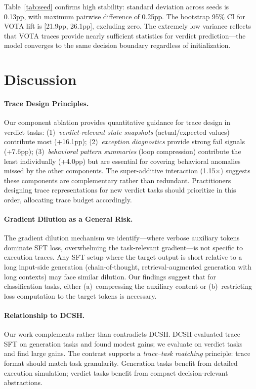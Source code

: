 \documentclass[11pt,a4paper]{article}
\begin{document}
Table~\ref{tab:seed} confirms high stability: standard deviation across seeds is 0.13pp, with maximum pairwise difference of 0.25pp. The bootstrap 95\% CI for VOTA lift is [21.9pp, 26.1pp], excluding zero. The extremely low variance reflects that VOTA traces provide nearly sufficient statistics for verdict prediction---the model converges to the same decision boundary regardless of initialization.

\section{Discussion}

\paragraph{Trace Design Principles.} Our component ablation provides quantitative guidance for trace design in verdict tasks: (1)~\emph{verdict-relevant state snapshots} (actual/expected values) contribute most (+16.1pp); (2)~\emph{exception diagnostics} provide strong fail signals (+7.6pp); (3)~\emph{behavioral pattern summaries} (loop compression) contribute the least individually (+4.0pp) but are essential for covering behavioral anomalies missed by the other components. The super-additive interaction (1.15$\times$) suggests these components are complementary rather than redundant. Practitioners designing trace representations for new verdict tasks should prioritize in this order, allocating trace budget accordingly.

\paragraph{Gradient Dilution as a General Risk.} The gradient dilution mechanism we identify---where verbose auxiliary tokens dominate SFT loss, overwhelming the task-relevant gradient---is not specific to execution traces. Any SFT setup where the target output is short relative to a long input-side generation (chain-of-thought, retrieval-augmented generation with long contexts) may face similar dilution. Our findings suggest that for classification tasks, either (a)~compressing the auxiliary content or (b)~restricting loss computation to the target tokens is necessary.

\paragraph{Relationship to DCSH.} Our work complements rather than contradicts DCSH. DCSH evaluated trace SFT on generation tasks and found modest gains; we evaluate on verdict tasks and find large gains. The contrast supports a \emph{trace--task matching} principle: trace format should match task granularity. Generation tasks benefit from detailed execution simulation; verdict tasks benefit from compact decision-relevant abstractions.
\end{document}
